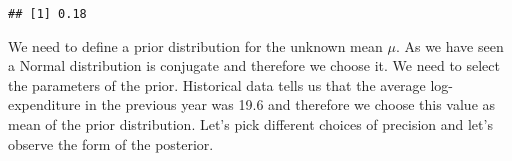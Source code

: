 \documentclass[
]{book}
\newenvironment{Shaded}{\begin{snugshade}}{\end{snugshade}}
\newcommand{\DecValTok}[1]{\textcolor[rgb]{0.00,0.00,0.81}{#1}}
\newcommand{\FunctionTok}[1]{\textcolor[rgb]{0.00,0.00,0.00}{#1}}
\newcommand{\NormalTok}[1]{#1}
\newcommand{\SpecialCharTok}[1]{\textcolor[rgb]{0.00,0.00,0.00}{#1}}
\begin{document}
\begin{Shaded}
\end{Shaded}

\begin{verbatim}
## [1] 0.18
\end{verbatim}

We need to define a prior distribution for the unknown mean \(\mu\). As we have seen a Normal distribution is conjugate and therefore we choose it. We need to select the parameters of the prior. Historical data tells us that the average log-expenditure in the previous year was 19.6 and therefore we choose this value as mean of the prior distribution. Let's pick different choices of precision and let's observe the form of the posterior.
\end{document}
